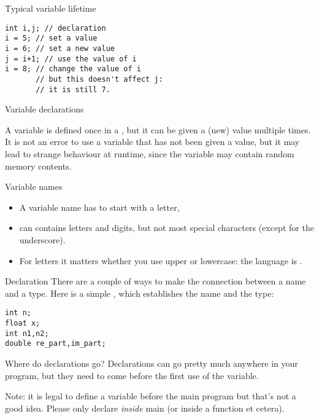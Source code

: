 \begin{block}{Typical variable lifetime}
  \label{sl:varlife}
\begin{verbatim}
int i,j; // declaration
i = 5; // set a value
i = 6; // set a new value
j = i+1; // use the value of i
i = 8; // change the value of i
       // but this doesn't affect j:
       // it is still 7.
\end{verbatim}
\end{block}

 {Variable declarations}

A variable is defined once
in a ,
but it can be given a (new) value multiple
times. It is not an error to use a variable that has not been given a
value, but it may lead to strange behaviour at runtime, since the
variable may contain random memory contents.

\begin{block}{Variable names}
  \label{sl:varname}
  \begin{itemize}
  \item
    A variable name has to start with a letter,
  \item can contains letters and  digits, but not most
    special characters (except for the underscore).
  \item For letters it matters
    whether you use upper or lowercase: the language is .
  \end{itemize}
\end{block}

\begin{block}{Declaration}
  \label{sl:declare-example}
  There are a couple of ways to make the connection between a name and a
  type. Here is a simple
  , which establishes the name
  and the type:
\begin{verbatim}
int n;
float x;
int n1,n2;
double re_part,im_part;
\end{verbatim}
\end{block}

\begin{block}{Where do declarations go?}
  \label{sl:declwhere}
  Declarations can go pretty much anywhere in your program, but they need
  to come before the first use of the variable.

  Note: it is legal to define a variable before the main program
  but that's not a good idea. Please only declare \emph{inside} main
  (or inside a function et cetera).
\end{block}

